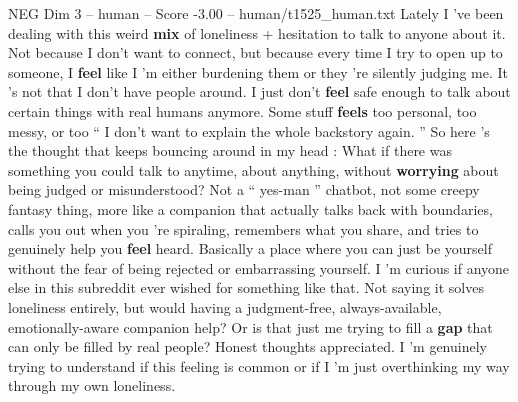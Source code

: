\begin{textsample}{NEG Dim 3 – human – Score -3.00 – human/t1525\_human.txt}  \label{ex:f3_neg_031}
Lately I ’ve been dealing with this weird \textbf{mix} of loneliness + hesitation to talk to anyone about it.
Not because I don't want to connect, but because every time I try to open up to someone, I \textbf{feel} like I ’m either burdening them or they ’re silently judging me.
It ’s not that I don't have people around.
I just don't \textbf{feel} safe enough to talk about certain things with real humans anymore.
Some stuff \textbf{feels} too personal, too messy, or too “ I don't want to explain the whole backstory again. ” So here ’s the thought that keeps bouncing around in my head : What if there was something you could talk to anytime, about anything, without \textbf{worrying} about being judged or misunderstood?
Not a “ yes-man ” chatbot, not some creepy fantasy thing, more like a companion that actually talks back with boundaries, calls you out when you ’re spiraling, remembers what you share, and tries to genuinely help you \textbf{feel} heard.
Basically a place where you can just be yourself without the fear of being rejected or embarrassing yourself.
I ’m curious if anyone else in this subreddit ever wished for something like that.
Not saying it solves loneliness entirely, but would having a judgment-free, always-available, emotionally-aware companion help?
Or is that just me trying to fill a \textbf{gap} that can only be filled by real people?
Honest thoughts appreciated.
I ’m genuinely trying to understand if this feeling is common or if I ’m just overthinking my way through my own loneliness.

\end{textsample}
